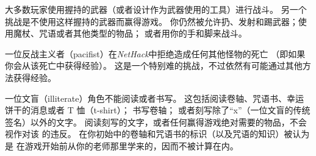 \documentclass[a4paper, 10pt]{article}
\begin{document}
大多数玩家使用握持的武器（或者设计作为武器使用的工具）进行战斗。
另一个挑战是不使用这样握持的武器而赢得游戏。
你仍然被允许扔、发射和踢武器；使用魔杖、咒语或者其他类型的物品；
或者用你的手和脚来战斗。

一位反战主义者（pacifist）在{\it NetHack\/}中拒绝造成任何其他怪物的死亡
（即如果你会从该死亡中获得经验）。
这是一个特别难的挑战，不过依然有可能通过其他方法获得经验。

一位文盲（illiterate）角色不能阅读或者书写。
这包括阅读卷轴、咒语书、幸运饼干的消息或者 T 恤（t-shirt）；
书写卷轴；
或者刻写除了“x”（一位文盲的传统签名）以外的文字。
阅读刻写的文字，或者任何赢得游戏绝对需要的物品，不会视作对该\zhTransConduct
的违反。
在你初始\zhTransInventory{}中的卷轴和咒语书的标识（以及咒语的知识）被认为是
在游戏开始前从你的老师那里学来的，因而不被计算在内。
\end{document}
